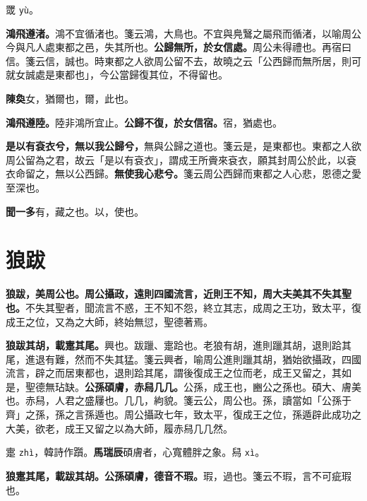 \begin{quoting}罭 \texttt{yù}。\end{quoting}

\textbf{鴻飛遵渚。}{\footnotesize 鴻不宜循渚也。箋云鴻，大鳥也。不宜與鳧鷖之屬飛而循渚，以喻周公今與凡人處東都之邑，失其所也。}\textbf{公歸無所，於女信處。}{\footnotesize 周公未得禮也。再宿曰信。箋云信，誠也。時東都之人欲周公留不去，故曉之云「公西歸而無所居，則可就女誠處是東都也」，今公當歸復其位，不得留也。}

\begin{quoting}\textbf{陳奐}女，猶爾也，爾，此也。\end{quoting}

\textbf{鴻飛遵陸。}{\footnotesize 陸非鴻所宜止。}\textbf{公歸不復，於女信宿。}{\footnotesize 宿，猶處也。}

\textbf{是以有袞衣兮，無以我公歸兮，}{\footnotesize 無與公歸之道也。箋云是，是東都也。東都之人欲周公留為之君，故云「是以有袞衣」，謂成王所賫來袞衣，願其封周公於此，以袞衣命留之，無以公西歸。}\textbf{無使我心悲兮。}{\footnotesize 箋云周公西歸而東都之人心悲，恩德之愛至深也。}

\begin{quoting}\textbf{聞一多}有，藏之也。以，使也。\end{quoting}

\section{狼跋}


\textbf{狼跋，美周公也。周公攝政，遠則四國流言，近則王不知，周大夫美其不失其聖也。}{\footnotesize 不失其聖者，聞流言不惑，王不知不怨，終立其志，成周之王功，致太平，復成王之位，又為之大師，終始無愆，聖德著焉。}

\textbf{狼跋其胡，載疐其尾。}{\footnotesize 興也。跋躐、疐跲也。老狼有胡，進則躐其胡，退則跲其尾，進退有難，然而不失其猛。箋云興者，喻周公進則躐其胡，猶始欲攝政，四國流言，辟之而居東都也，退則跲其尾，謂後復成王之位而老，成王又留之，其如是，聖德無玷缺。}\textbf{公孫碩膚，赤舄几几。}{\footnotesize 公孫，成王也，豳公之孫也。碩大、膚美也。赤舄，人君之盛屨也。几几，絇貌。箋云公，周公也。孫，讀當如「公孫于齊」之孫，孫之言孫遁也。周公攝政七年，致太平，復成王之位，孫遁辟此成功之大美，欲老，成王又留之以為大師，履赤舄几几然。}

\begin{quoting}疐 \texttt{zhì}，韓詩作躓。\textbf{馬瑞辰}碩膚者，心寬體胖之象。舄 \texttt{xì}。\end{quoting}

\textbf{狼疐其尾，載跋其胡。公孫碩膚，德音不瑕。}{\footnotesize 瑕，過也。箋云不瑕，言不可疵瑕也。}

